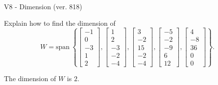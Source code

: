 \begin{exercise}
  \begin{exerciseTitle}V8 - Dimension (ver. 818)\end{exerciseTitle}
  \begin{exerciseStatement}
    Explain how to find the dimension of 
\[W=\mathrm{span}\ \left\{\left[\begin{array}{r}
-1 \\
0 \\
-3 \\
1 \\
2
\end{array}\right] , \left[\begin{array}{r}
1 \\
2 \\
-3 \\
-2 \\
-4
\end{array}\right] , \left[\begin{array}{r}
3 \\
-2 \\
15 \\
-2 \\
-4
\end{array}\right] , \left[\begin{array}{r}
-5 \\
-2 \\
-9 \\
6 \\
12
\end{array}\right] , \left[\begin{array}{r}
4 \\
-8 \\
36 \\
0 \\
0
\end{array}\right]\right\}.\]



  \end{exerciseStatement}
  \begin{exerciseAnswer}
   The dimension of \(W\) is  \(2\).
  


  \end{exerciseAnswer}
\end{exercise}